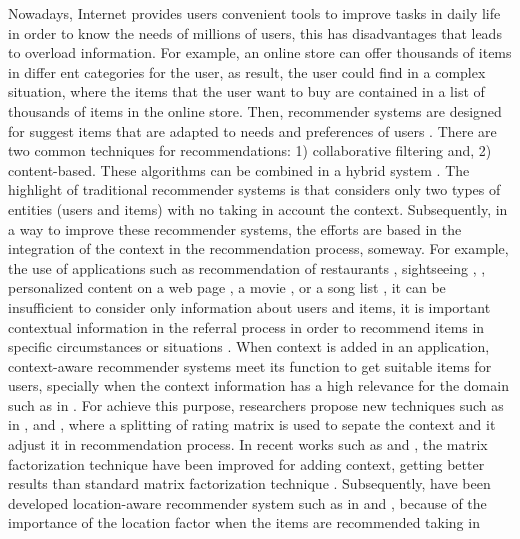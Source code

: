 Nowadays, Internet provides users convenient tools to improve tasks in daily
life in order to know the needs of millions of users, this has disadvantages
that leads to overload information. For example, an online store can offer
thousands of items in differ  ent categories for the user, as result, the user
could find in a complex situation, where the items that the user want to buy are
contained in a list of thousands of items in the online store. Then, recommender
systems are designed for suggest items that are adapted to needs and preferences
of users \cite{ricci2011introduction}. There are two common  techniques for
recommendations: 1) collaborative filtering and, 2) content-based. These
algorithms can be combined in a hybrid system \cite{burke2007hybrid}.   The
highlight of traditional recommender systems is that considers only two types of
entities (users and items) with no taking in account the context. Subsequently,
in a way to improve these recommender systems, the efforts are based in the
integration of the context in the recommendation process, someway. For example,
the use of applications such as recommendation of restaurants
\cite{ramirez2014post}, sightseeing \cite{baltrunas2011},
\cite{baltrunas2011context}, personalized content on a web page
\cite{marina2010ontology}, a movie \cite{kim2010recommender}, or a song list
\cite{baltrunas2011incarmusic}, it can be insufficient to consider only
information about users and items, it is important contextual information in the
referral process in order to recommend items in specific circumstances or
situations \cite{zimmermann2000personalization}.  When context is added in an
application, context-aware recommender systems meet its  function to get
suitable items for users, specially when the context information has a high
relevance for the domain such as in \cite{baltrunas2011context}.  For achieve
this purpose, researchers propose new techniques such as in
\cite{said2011inferring},\cite{zheng2014splitting} and
\cite{baltrunas2009context2} , where a splitting of rating matrix is used to
sepate the context and it adjust it in recommendation process.   In recent works
such as \cite{zhengcorrelation} and \cite{baltrunas2011matrix} , the matrix
factorization technique have been improved for adding context, getting better
results than standard matrix factorization technique \cite{koren2009matrix}.
Subsequently, have been developed location-aware recommender system such as in
\cite{levandoski2012lars} and \cite{kaminskas2011location}, because of the
importance of the location factor when the items are recommended taking in

